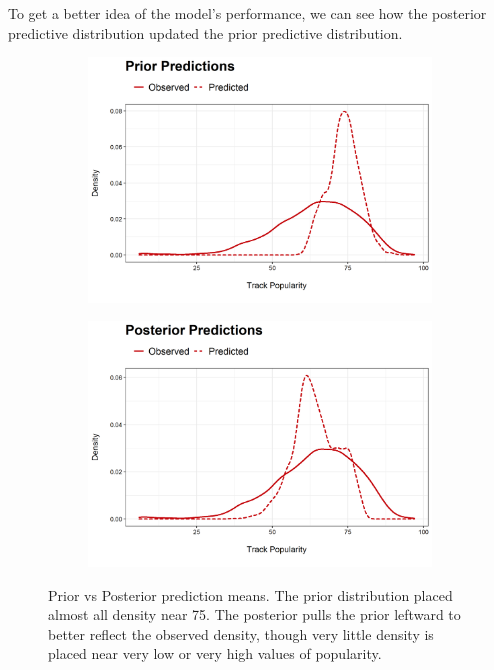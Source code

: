 \documentclass[12pt, twoside]{article}
\begin{document}
To get a better idea of the model's performance, we can see how the posterior predictive distribution updated the prior predictive distribution.

\begin{figure}[H]
\begin{subfigure}[b]{0.5\textwidth}
\centering
\includegraphics[width = \textwidth]{prior_predictions.png}
\caption{}
\label{fig:prior}
\end{subfigure}
\begin{subfigure}[b]{0.5\textwidth}
\centering
\includegraphics[width = \textwidth]{post_predictions.png}
\caption{}
\label{fig:post}
\end{subfigure}
\caption{Prior vs Posterior prediction means. The prior distribution placed almost all density near 75. The posterior pulls the prior leftward to better reflect the observed density, though very little density is placed near very low or very high values of popularity.}
\end{figure}
\end{document}
